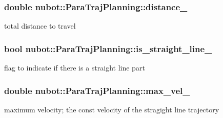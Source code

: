 \hypertarget{classnubot_1_1ParaTrajPlanning_a2c2401906a5ad585d91bedb46261302a}{
\subsubsection[{distance\-\_\-}]{\setlength{\rightskip}{0pt plus 5cm}double nubot\-::\-Para\-Traj\-Planning\-::distance\-\_\-\hspace{0.3cm}{\ttfamily [private]}}}\label{classnubot_1_1ParaTrajPlanning_a2c2401906a5ad585d91bedb46261302a}


total distance to travel 

\hypertarget{classnubot_1_1ParaTrajPlanning_a3a03e2c86a799f827aef25d1d928910e}{
\subsubsection[{is\-\_\-straight\-\_\-line\-\_\-}]{\setlength{\rightskip}{0pt plus 5cm}bool nubot\-::\-Para\-Traj\-Planning\-::is\-\_\-straight\-\_\-line\-\_\-\hspace{0.3cm}{\ttfamily [private]}}}\label{classnubot_1_1ParaTrajPlanning_a3a03e2c86a799f827aef25d1d928910e}


flag to indicate if there is a straight line part 

\hypertarget{classnubot_1_1ParaTrajPlanning_a28df46426852cc6627549f800512d8cf}{
\subsubsection[{max\-\_\-vel\-\_\-}]{\setlength{\rightskip}{0pt plus 5cm}double nubot\-::\-Para\-Traj\-Planning\-::max\-\_\-vel\-\_\-\hspace{0.3cm}{\ttfamily [private]}}}\label{classnubot_1_1ParaTrajPlanning_a28df46426852cc6627549f800512d8cf}


maximum velocity; the const velocity of the stragight line trajectory 

